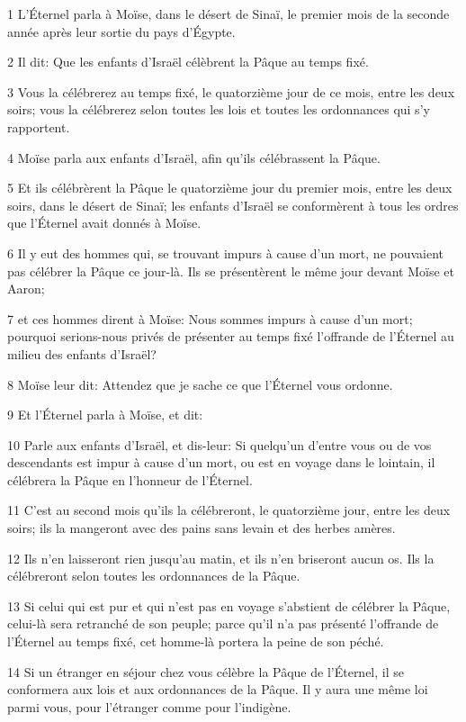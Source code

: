 \par 1 L'Éternel parla à Moïse, dans le désert de Sinaï, le premier mois de la seconde année après leur sortie du pays d'Égypte.
\par 2 Il dit: Que les enfants d'Israël célèbrent la Pâque au temps fixé.
\par 3 Vous la célébrerez au temps fixé, le quatorzième jour de ce mois, entre les deux soirs; vous la célébrerez selon toutes les lois et toutes les ordonnances qui s'y rapportent.
\par 4 Moïse parla aux enfants d'Israël, afin qu'ils célébrassent la Pâque.
\par 5 Et ils célébrèrent la Pâque le quatorzième jour du premier mois, entre les deux soirs, dans le désert de Sinaï; les enfants d'Israël se conformèrent à tous les ordres que l'Éternel avait donnés à Moïse.
\par 6 Il y eut des hommes qui, se trouvant impurs à cause d'un mort, ne pouvaient pas célébrer la Pâque ce jour-là. Ils se présentèrent le même jour devant Moïse et Aaron;
\par 7 et ces hommes dirent à Moïse: Nous sommes impurs à cause d'un mort; pourquoi serions-nous privés de présenter au temps fixé l'offrande de l'Éternel au milieu des enfants d'Israël?
\par 8 Moïse leur dit: Attendez que je sache ce que l'Éternel vous ordonne.
\par 9 Et l'Éternel parla à Moïse, et dit:
\par 10 Parle aux enfants d'Israël, et dis-leur: Si quelqu'un d'entre vous ou de vos descendants est impur à cause d'un mort, ou est en voyage dans le lointain, il célébrera la Pâque en l'honneur de l'Éternel.
\par 11 C'est au second mois qu'ils la célébreront, le quatorzième jour, entre les deux soirs; ils la mangeront avec des pains sans levain et des herbes amères.
\par 12 Ils n'en laisseront rien jusqu'au matin, et ils n'en briseront aucun os. Ils la célébreront selon toutes les ordonnances de la Pâque.
\par 13 Si celui qui est pur et qui n'est pas en voyage s'abstient de célébrer la Pâque, celui-là sera retranché de son peuple; parce qu'il n'a pas présenté l'offrande de l'Éternel au temps fixé, cet homme-là portera la peine de son péché.
\par 14 Si un étranger en séjour chez vous célèbre la Pâque de l'Éternel, il se conformera aux lois et aux ordonnances de la Pâque. Il y aura une même loi parmi vous, pour l'étranger comme pour l'indigène.
